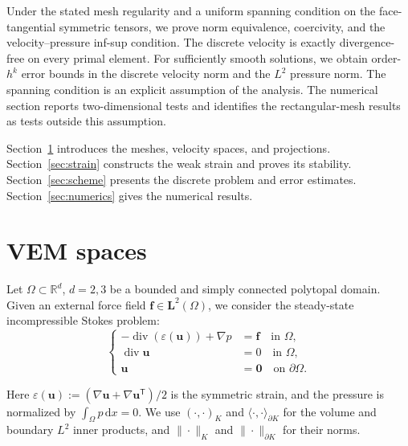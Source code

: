 \documentclass[review,hidelinks,onefignum,onetabnum]{siamart251216}
\newcommand{\AI}[1]{{\color{blue}#1}}
\begin{document}
{Under the stated mesh regularity and a uniform spanning condition on the
face-tangential symmetric tensors, we prove norm equivalence, coercivity,
and the velocity--pressure inf-sup condition. The discrete velocity is exactly
divergence-free on every primal element. For sufficiently smooth solutions,
we obtain order-$h^k$ error bounds in the discrete velocity norm and the
$L^2$ pressure norm. The spanning condition is an explicit assumption of the
analysis. The numerical section reports two-dimensional tests and identifies
the rectangular-mesh results as tests outside this assumption.

Section~\ref{sec:spaces} introduces the meshes, velocity spaces, and
projections. Section~\ref{sec:strain} constructs the weak strain and proves
its stability. Section~\ref{sec:scheme} presents the discrete problem and
error estimates. Section~\ref{sec:numerics} gives the numerical results.}

\section{VEM spaces}\label{sec:spaces}

Let \(\Omega \subset \mathbb{R}^d\), \(d = 2, 3\) be a bounded and simply connected polytopal domain. Given an
external force field \(\boldsymbol{f} \in \boldsymbol{L}^2(\Omega)\), we consider the steady-state incompressible Stokes problem:
\begin{equation}\label{eq:stokes}
\left\{
\begin{aligned}
-\operatorname{div}(\varepsilon(\boldsymbol{u})) + \nabla p &= \boldsymbol{f} \quad \text{in } \Omega, \\
\operatorname{div} \boldsymbol{u} &= 0 \quad \text{in } \Omega, \\
\boldsymbol{u} &= \boldsymbol{0} \quad \text{on } \partial\Omega.
\end{aligned}
\right.
\end{equation}


\AI{Here $\varepsilon(\boldsymbol u):=(\nabla\boldsymbol u+
\nabla\boldsymbol u^{\mathsf T})/2$ is the symmetric strain, and the pressure
is normalized by $\int_\Omega p\,\mathrm dx=0$. We use $(\cdot,\cdot)_K$ and
$\langle\cdot,\cdot\rangle_{\partial K}$ for the volume and boundary $L^2$
inner products, and $\|\cdot\|_K$ and $\|\cdot\|_{\partial K}$ for their norms.
}
\end{document}
